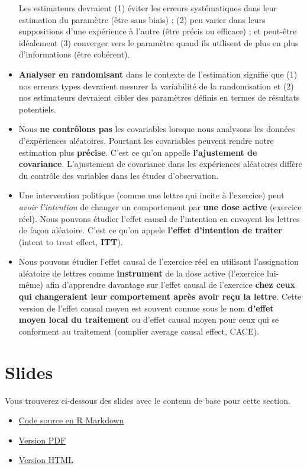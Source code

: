 \documentclass[
  12pt,
]{book}
\begin{document}
\begin{itemize}
  Les estimateurs devraient (1) éviter les erreurs systématiques dans leur estimation du paramètre (être sans biais) ; (2) peu varier dans leurs suppositions d'une expérience à l'autre (être précis ou efficace) ; et peut-être idéalement (3) converger vers le paramètre quand ils utilisent de plus en plus d'informations (être cohérent).
\item
  \textbf{Analyser en randomisant} dans le contexte de l'estimation signifie que (1) nos erreurs types devraient mesurer la variabilité de la randomisation et (2) nos estimateurs devraient cibler des paramètres définis en termes de résultats potentiels.
\item
  Nous \textbf{ne contrôlons pas} les covariables lorsque nous analysons les données d'expériences aléatoires. Pourtant les covariables peuvent rendre notre estimation plus \textbf{précise}. C'est ce qu'on appelle \textbf{l'ajustement de covariance}. L'ajustement de covariance dans les expériences aléatoires diffère du contrôle des variables dans les études d'observation.
\item
  Une intervention politique (comme une lettre qui incite à l'exercice) peut \emph{avoir l'intention} de changer un comportement par \textbf{une dose active} (exercice réel). Nous pouvons étudier l'effet causal de l'intention en envoyent les lettres de façon aléatoire. C'est ce qu'on appele \textbf{l'effet d'intention de traiter} (intent to treat effect, \textbf{ITT}).
\item
  Nous pouvons étudier l'effet causal de l'exercice réel en utilisant l'assignation aléatoire de lettres comme \textbf{instrument} de la dose active (l'exercice lui-même) afin d'apprendre davantage sur l'effet causal de l'exercice \textbf{chez ceux qui changeraient leur comportement après avoir reçu la lettre}. Cette version de l'effet causal moyen est souvent connue sous le nom \textbf{d'effet moyen local du traitement} ou d'effet causal moyen pour ceux qui se conforment au traitement (complier average causal effect, CACE).
\end{itemize}

\hypertarget{slides-4}{%
\section{Slides}\label{slides-4}}

Vous trouverez ci-dessous des slides avec le contenu de base pour cette section.

\begin{itemize}
\item
  \href{https://egap.github.io/learningdays-resources/Slides/estimation-slides.Rmd}{Code source en R Markdown}
\item
  \href{https://egap.github.io/learningdays-resources/Slides/estimation-slides.pdf}{Version PDF}
\item
  \href{https://egap.github.io/learningdays-resources/Slides/estimation-slides.html}{Version HTML}
\end{itemize}
\end{document}
